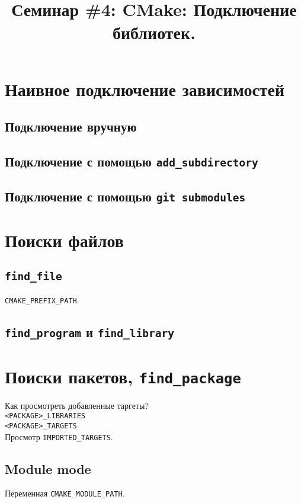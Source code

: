 \documentclass{article}
\begin{document}
\title{Семинар \#4: CMake: Подключение библиотек. \vspace{-5ex}}
\date{}\maketitle

\section{Наивное подключение зависимостей}
\subsection*{Подключение вручную}
\subsection*{Подключение с помощью \texttt{add\_subdirectory}}
\subsection*{Подключение с помощью \texttt{git submodules}}


\section{Поиски файлов}
\subsection*{\texttt{find\_file}}
\texttt{CMAKE\_PREFIX\_PATH}.
\subsection*{\texttt{find\_program} и \texttt{find\_library}}


\section{Поиски пакетов, \texttt{find\_package}}
Как просмотреть добавленные таргеты?\\
\texttt{<PACKAGE>\_LIBRARIES}\\
\texttt{<PACKAGE>\_TARGETS}\\
Просмотр \texttt{IMPORTED\_TARGETS}.\\

\subsection*{Module mode}
Переменная \texttt{CMAKE\_MODULE\_PATH}.
\end{document}
